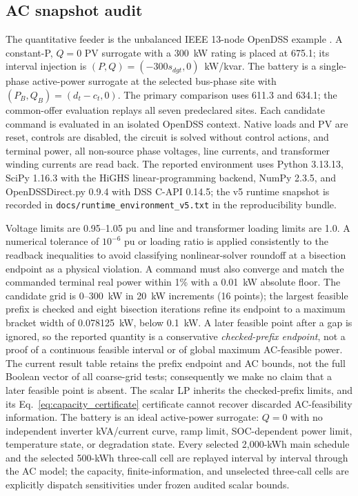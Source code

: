 \documentclass[11pt]{article}
\newcommand{\kw}[1]{#1~kW}
\begin{document}
\subsection{AC snapshot audit}
The quantitative feeder is the unbalanced IEEE 13-node OpenDSS example \cite{OpenDSS13}. A constant-P, $Q=0$ PV surrogate with a 300~kW rating is placed at 675.1; its interval injection is $(P,Q)=(-300s_{dgt},0)$~kW/kvar. The battery is a single-phase active-power surrogate at the selected bus-phase site with $(P_B,Q_B)=(d_t-c_t,0)$. The primary comparison uses 611.3 and 634.1; the common-offer evaluation replays all seven predeclared sites. Each candidate command is evaluated in an isolated OpenDSS context. Native loads and PV are reset, controls are disabled, the circuit is solved without control actions, and terminal power, all non-source phase voltages, line currents, and transformer winding currents are read back. The reported environment uses Python 3.13.13, SciPy 1.16.3 with the HiGHS linear-programming backend, NumPy 2.3.5, and OpenDSSDirect.py 0.9.4 with DSS C-API 0.14.5; the v5 runtime snapshot is recorded in \texttt{docs/runtime\_environment\_v5.txt} in the reproducibility bundle.

Voltage limits are 0.95--1.05 pu and line and transformer loading limits are 1.0. A numerical tolerance of $10^{-6}$ pu or loading ratio is applied consistently to the readback inequalities to avoid classifying nonlinear-solver roundoff at a bisection endpoint as a physical violation. A command must also converge and match the commanded terminal real power within 1\% with a 0.01~kW absolute floor. The candidate grid is 0--\kw{300} in \kw{20} increments (16 points); the largest feasible prefix is checked and eight bisection iterations refine its endpoint to a maximum bracket width of 0.078125~kW, below \kw{0.1}. A later feasible point after a gap is ignored, so the reported quantity is a conservative \emph{checked-prefix endpoint}, not a proof of a continuous feasible interval or of global maximum AC-feasible power. The current result table retains the prefix endpoint and AC bounds, not the full Boolean vector of all coarse-grid tests; consequently we make no claim that a later feasible point is absent. The scalar LP inherits the checked-prefix limits, and its Eq.~\eqref{eq:capacity_certificate} certificate cannot recover discarded AC-feasibility information. The battery is an ideal active-power surrogate: $Q=0$ with no independent inverter kVA/current curve, ramp limit, SOC-dependent power limit, temperature state, or degradation state. Every selected 2,000-kWh main schedule and the selected 500-kWh three-call cell are replayed interval by interval through the AC model; the capacity, finite-information, and unselected three-call cells are explicitly dispatch sensitivities under frozen audited scalar bounds.
\end{document}

